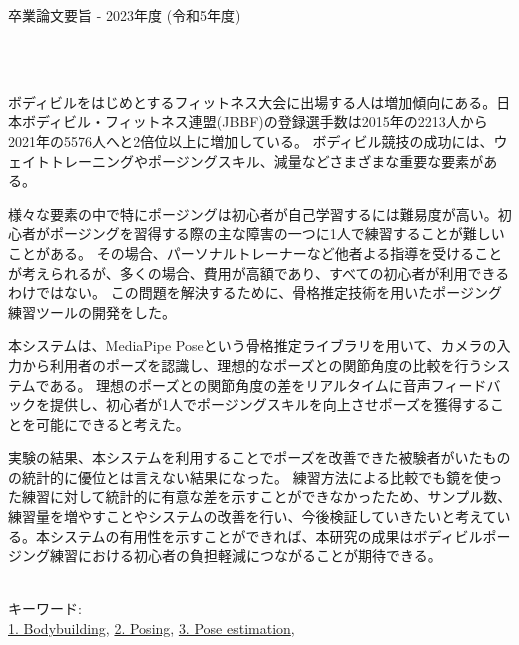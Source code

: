 卒業論文要旨 - 2023年度 (令和5年度)
\begin{center}
\begin{large}
\end{large}　
\end{center}

~ \\
  ボディビルをはじめとするフィットネス大会に出場する人は増加傾向にある。日本ボディビル・フィットネス連盟(JBBF)の登録選手数は2015年の2213人から2021年の5576人へと2倍位以上に増加している\cite{jbbf}。
  ボディビル競技の成功には、ウェイトトレーニングやポージングスキル、減量などさまざまな重要な要素がある。

  様々な要素の中で特にポージングは初心者が自己学習するには難易度が高い。初心者がポージングを習得する際の主な障害の一つに1人で練習することが難しいことがある。
  その場合、パーソナルトレーナーなど他者よる指導を受けることが考えられるが、多くの場合、費用が高額であり、すべての初心者が利用できるわけではない。
  この問題を解決するために、骨格推定技術を用いたポージング練習ツールの開発をした。

  本システムは、MediaPipe Poseという骨格推定ライブラリを用いて、カメラの入力から利用者のポーズを認識し、理想的なポーズとの関節角度の比較を行うシステムである。
  理想のポーズとの関節角度の差をリアルタイムに音声フィードバックを提供し、初心者が1人でポージングスキルを向上させポーズを獲得することを可能にできると考えた。

  実験の結果、本システムを利用することでポーズを改善できた被験者がいたものの統計的に優位とは言えない結果になった。
  練習方法による比較でも鏡を使った練習に対して統計的に有意な差を示すことができなかったため、サンプル数、練習量を増やすことやシステムの改善を行い、今後検証していきたいと考えている。本システムの有用性を示すことができれば、本研究の成果はボディビルポージング練習における初心者の負担軽減につながることが期待できる。

~ \\
キーワード:\\
\underline{1. Bodybuilding},
\underline{2. Posing},
\underline{3. Pose estimation},
\begin{flushright}
\dept \\
\author
\end{flushright}
